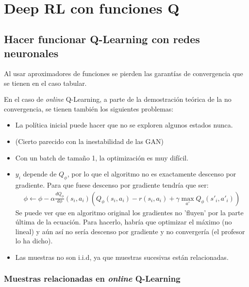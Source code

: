\chapter{Deep RL con funciones Q}


\section{Hacer funcionar Q-Learning con redes neuronales}%
\label{sec:hacer_funcionar_q_learning_con_redes_neuronales}

Al usar aproximadores de funciones se pierden las garantías de convergencia que se tienen en el
caso tabular. 

En el caso de \textit{online} Q-Learning, a parte de la demostración teórica de la no
convergencia, se tienen también los siguientes problemas:
\begin{itemize}
    \item La política inicial puede hacer que no se exploren algunos estados nunca.
    \item (Cierto parecido con la inestabilidad de las GAN)
    \item Con un batch de tamaño 1, la optimización es muy difícil.
    \item $y_i$ depende de  $Q_\phi$, por lo que el algoritmo no es exactamente
        descenso por gradiente. Para que fuese descenso por gradiente tendría que ser:
        \begin{align}
            \phi\gets\phi-\alpha \frac{dQ_\phi}{d\phi}
            (s_i,a_i)(Q_\phi(s_i,a_i)-r(s_i,a_i)+\gamma\max_{a'}Q_\phi(s'_i,a'_i))
        \end{align}
        Se puede ver que en algoritmo original los gradientes no 'fluyen' por la parte última
        de la ecuación. Para hacerlo, habría que optimizar el máximo (no lineal) y aún así no
        sería descenso por gradiente y no convergería (el profesor lo ha dicho).
        \item Las muestras no son i.i.d, ya que muestras sucesivas están relacionadas.
\end{itemize}

\subsection{Muestras relacionadas en \textit{online} Q-Learning}%
\label{sub:muestras_relacionadas_en_online_q_learning}

